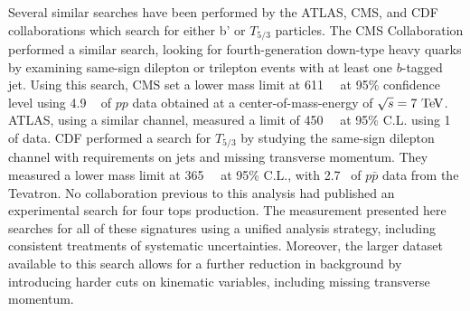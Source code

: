 Several similar searches have been performed by the ATLAS, CMS, and CDF collaborations which search for either b' or $T_{5/3}$ particles.
The CMS Collaboration performed a similar search, looking for fourth-generation down-type heavy quarks by examining same-sign dilepton or trilepton events with at least one $b$-tagged jet.
Using this search, CMS set a lower mass limit at 611~\GeV{}~\cite{Chatrchyan:2012yea} at 95\% confidence level using 4.9 ~\ifb{} of $pp$ data obtained at a center-of-mass-energy of $\sqrt{s}=7 \TeV$.
ATLAS, using a similar channel, measured a limit of 450~\GeV{}~\cite{Collaboration:2012vs} at 95\% C.L. using 1~\ifb{} of data.
CDF performed a search for $T_{5/3}$ by studying the same-sign dilepton channel with requirements on jets and missing transverse momentum.
They measured a lower mass limit at 365~\GeV{}~\cite{Aaltonen:bprime_singlelepton} at 95\% C.L., with 2.7~\ifb{} of $p\bar{p}$ data from the Tevatron.  
No collaboration previous to this analysis had published an experimental search for four tops production.
The measurement presented here searches for all of these signatures using a unified analysis strategy, including consistent treatments of systematic uncertainties.
Moreover, the larger dataset available to this search allows for a further reduction in background by introducing harder cuts on kinematic variables, including missing transverse momentum.





